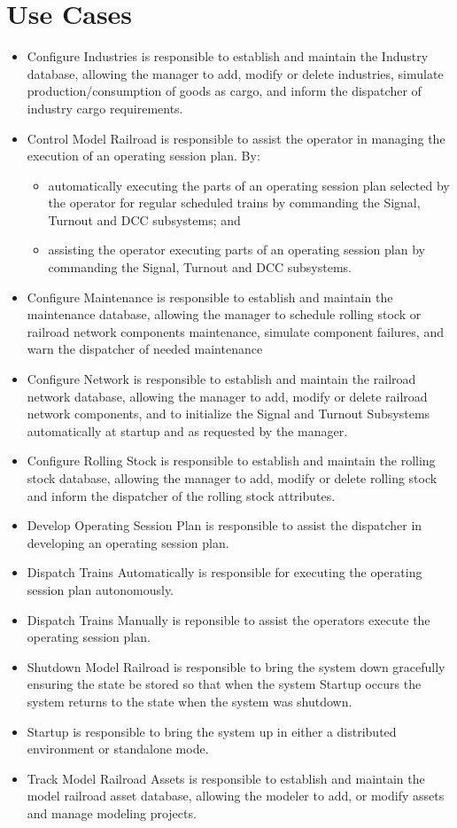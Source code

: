 \section{Use Cases}
\begin{itemize}
  \item Configure Industries is responsible to establish and maintain the Industry database, allowing the manager to add, modify or delete industries, simulate production/consumption of goods as cargo, and inform the dispatcher of industry cargo requirements.
  \item Control Model Railroad is responsible to assist the operator in managing the execution of an operating session plan. By:
\begin{itemize}
  \item automatically executing the parts of an operating session plan selected by the operator for regular scheduled trains by commanding the Signal, Turnout and \ac{DCC} subsystems; and
  \item assisting the operator executing parts of an operating session plan by commanding the Signal, Turnout and \ac{DCC} subsystems.
\end{itemize}
  \item Configure Maintenance is responsible to establish and maintain the maintenance database, allowing the manager to schedule rolling stock or railroad network components maintenance, simulate component failures, and warn the dispatcher of needed maintenance
  \item Configure Network is responsible to establish and maintain the railroad network database, allowing the manager to add, modify or delete railroad network components, and to initialize the Signal and Turnout Subsystems automatically at startup and as requested by the manager.
  \item Configure Rolling Stock is responsible to establish and maintain the rolling stock database, allowing the manager to add, modify or delete rolling stock and inform the dispatcher of the rolling stock attributes.
  \item Develop Operating Session Plan is responsible to assist the dispatcher in developing an operating session plan.
  \item Dispatch Trains Automatically is responsible for executing the operating session plan autonomously.
  \item Dispatch Trains Manually is reponsible to assist the operators execute the operating session plan.
  \item Shutdown Model Railroad is responsible to bring the system down gracefully ensuring the state be stored so that when the system Startup occurs the system returns to the state when the system was shutdown.
  \item Startup is responsible to bring the system up in either a distributed environment or standalone mode.
  \item Track Model Railroad Assets is responsible to establish and maintain the model railroad asset database, allowing the modeler to add, or modify assets and manage modeling projects.
\end{itemize}
